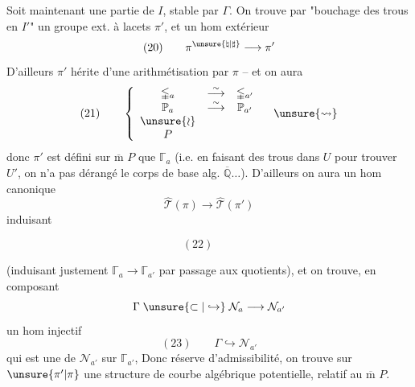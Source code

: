 Soit maintenant
une
partie de $I$, stable par $\Gamma$. On trouve
par "bouchage des trous en $I'$" un
groupe ext. à lacets $\pi'$,  et un
hom extérieur
\[
(20)\qquad \pi^{\unsure{\natural|\sharp}}\longrightarrow\pi'
\]
D'ailleurs $\pi'$ hérite d'une arithmétisation 
par $\pi$ -- et on aura
\[
(21)\qquad
\left\{
\begin{array}{ccc}
\mathbb{\Gamma}_a & \overset{\sim}{\longrightarrow} & \mathbb{\Gamma}_{a'} \\
\mathbb P_a & \overset{\sim}{\longrightarrow} & \mathbb P_{a'} \\
\unsure{\wr} & & \\
P & &
\end{array}
\right.
\quad\unsure{\leadsto}
\]
donc $\pi'$ est défini sur  $\overline{\mathrm m}$ $P$ que
$\mathbb{\Gamma}_a$
(i.e. en faisant des trous dans $U$ pour
trouver $U'$, on n'a pas dérangé le
corps de base alg.  $\overline{\mathbb Q}\ldots$). D'ailleurs
on aura un hom canonique
\[
\widehat{\mathcal T}(\pi)\longrightarrow
\widehat{\mathcal T}(\pi')
\]
induisant
\begin{samepage}
\[
(22)\qquad
\]
\end{samepage}



(induisant justement $\mathbb{\Gamma}_a\longrightarrow\mathbb{\Gamma}_{a'}$ par passage
aux quotients), et on trouve, en
composant
\[
\Gamma\;\unsure{\subset|\hookrightarrow}\;\mathcal N_a\longrightarrow\mathcal N_{a'}
\]
un hom  injectif
\[
(23)\qquad\Gamma\hookrightarrow\mathcal N_{a'}
\]
qui est une  de $\mathcal N_{a'}$ sur $\mathbb{\Gamma}_{a'}$,
Donc  réserve d'admissibilité,
on trouve sur  $\unsure{\pi'|\pi}$ une structure
de courbe algébrique potentielle, relatif
au $\overline{\mathrm m}$ $P$.

